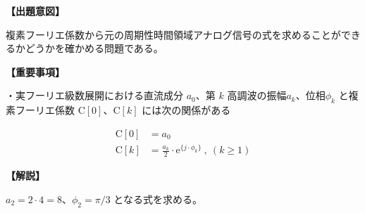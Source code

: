 \noindent \textbf{【出題意図】}

\bigskip
\noindent 複素フーリエ係数から元の周期性時間領域アナログ信号の式を求めることができるかどうかを確かめる問題である。

\vspace{1em}
\noindent \textbf{【重要事項】}

\medskip
\noindent・実フーリエ級数展開における直流成分 $a_0$、第 $k$ 高調波の振幅$a_k$、位相$\phi_k$ と複素フーリエ係数 $\textrm{C}[0]$、$\textrm{C}[k]$ には次の関係がある

\begin{align*}
\textrm{C}[0] &= a_0 \\
\textrm{C}[k] &= \frac{a_k}{2} \cdot \textrm{e}^{\{j \cdot \phi_k \}} \ ,\ (k\geq 1)
\end{align*}


\bigskip

\vspace{1em}
\noindent \textbf{【解説】}

\bigskip
\noindent 
$a_2 = 2\cdot 4 = 8$、$\phi_2 = \pi/3$ となる式を求める。

